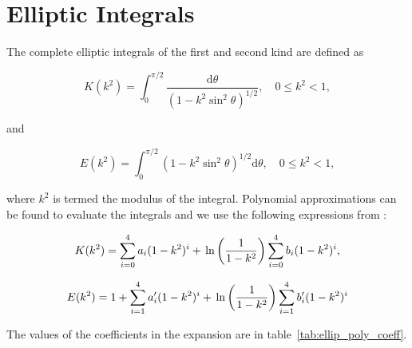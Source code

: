 \documentclass[12pt]{article}
\begin{document}
\section{Elliptic Integrals}
\label{app:ellip}

The complete elliptic integrals of the first and second kind are defined as \citep{Abramowitz72}

\begin{equation}
\label{equ:ellip1}
K(k^{2}) = \int_{0}^{\pi/2} \frac{\mathrm{d}\theta}{(1 - k^{2} \sin^{2}\theta)^{1/2}}, \quad 0 \leq k^{2} < 1,
\end{equation}

and

\begin{equation}
\label{equ:ellip2}
E(k^{2}) = \int_{0}^{\pi/2} (1 - k^{2} \sin^{2}\theta)^{1/2} \mathrm{d}\theta, \quad 0 \leq k^{2} < 1,
\end{equation}


where $k^{2}$ is termed the modulus of the integral. Polynomial approximations can be found to evaluate the integrals \citep{Roumeliotis00} and we use the following expressions from \citet{Abramowitz72}:

\begin{equation}
\label{equ:ellip1_app}
K(k^{2}) = \sum_{i = 0}^{4} a_{i} (1 - k^{2})^{i} + \\\ln\left(\frac{1}{1 - k^{2}} \right) \sum_{i = 0}^{4} b_{i} (1 - k^{2})^{i},
\end{equation}

\begin{equation}
\label{equ:ellip2_app}
E(k^{2}) = 1 + \sum_{i = 1}^{4} a'_{i} (1 - k^{2})^{i} + \\\ln\left(\frac{1}{1 - k^{2}} \right) \sum_{i = 1}^{4} b'_{i} (1 - k^{2})^{i}
\end{equation}

The values of the coefficients in the expansion are in table~\ref{tab:ellip_poly_coeff}.
\end{document}
